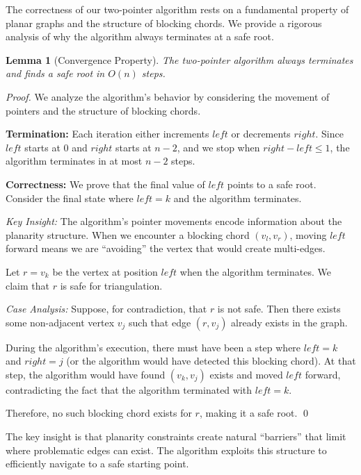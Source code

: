 \documentclass[12pt,a4paper]{article}
\newtheorem{lemma}{Lemma}
\begin{document}
The correctness of our two-pointer algorithm rests on a fundamental property of planar graphs and the structure of blocking chords. We provide a rigorous analysis of why the algorithm always terminates at a safe root.

\begin{lemma}[Convergence Property]
The two-pointer algorithm always terminates and finds a safe root in $O(n)$ steps.
\end{lemma}

\begin{proof}
We analyze the algorithm's behavior by considering the movement of pointers and the structure of blocking chords.

\textbf{Termination:} Each iteration either increments $left$ or decrements $right$. Since $left$ starts at $0$ and $right$ starts at $n-2$, and we stop when $right - left \leq 1$, the algorithm terminates in at most $n-2$ steps.

\textbf{Correctness:} We prove that the final value of $left$ points to a safe root. Consider the final state where $left = k$ and the algorithm terminates.

\textit{Key Insight:} The algorithm's pointer movements encode information about the planarity structure. When we encounter a blocking chord $(v_l, v_r)$, moving $left$ forward means we are ``avoiding'' the vertex that would create multi-edges.

Let $r = v_k$ be the vertex at position $left$ when the algorithm terminates. We claim that $r$ is safe for triangulation.

\textit{Case Analysis:} Suppose, for contradiction, that $r$ is not safe. Then there exists some non-adjacent vertex $v_j$ such that edge $(r, v_j)$ already exists in the graph. 

During the algorithm's execution, there must have been a step where $left = k$ and $right = j$ (or the algorithm would have detected this blocking chord). At that step, the algorithm would have found $(v_k, v_j)$ exists and moved $left$ forward, contradicting the fact that the algorithm terminated with $left = k$.

Therefore, no such blocking chord exists for $r$, making it a safe root. \qed
\end{proof}

The key insight is that planarity constraints create natural ``barriers'' that limit where problematic edges can exist. The algorithm exploits this structure to efficiently navigate to a safe starting point.
\end{document}
